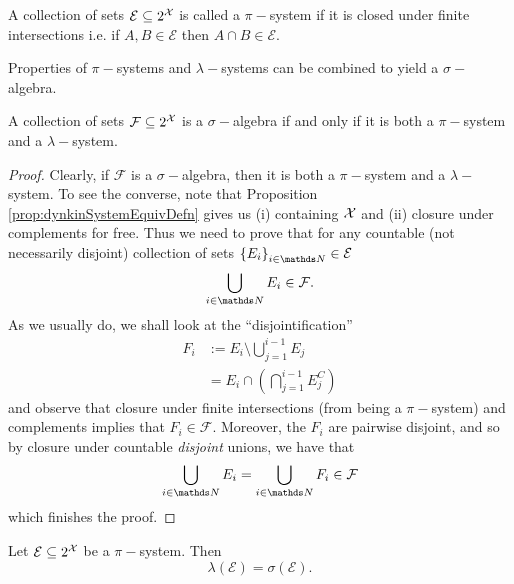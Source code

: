 \begin{defn}
\label{def:piSystem}A collection of sets $\mathcal{E}\subseteq2^{\mathcal{X}}$
is called a $\pi-$system if it is closed under finite intersections
i.e. if $A,B\in\mathcal{E}$ then $A\cap B\in\mathcal{E}$.
\end{defn}

Properties of $\pi-$systems and $\lambda-$systems can be combined
to yield a $\sigma-$algebra.
\begin{lem}
\label{lem:piLambdaIsSigma}A collection of sets $\mathcal{F}\subseteq2^{\mathcal{X}}$
is a $\sigma-$algebra if and only if it is both a $\pi-$system and
a $\lambda-$system.
\end{lem}

\begin{proof}
Clearly, if $\mathcal{F}$ is a $\sigma-$algebra, then it is both
a $\pi-$system and a $\lambda-$system. To see the converse, note
that Proposition \ref{prop:dynkinSystemEquivDefn} gives us (i) containing
$\mathcal{X}$ and (ii) closure under complements for free. Thus we need to
prove that for any countable (not necessarily disjoint) collection
of sets $\left\{ E_{i}\right\} _{i\in\N}\in\mathcal{E}$
\[
\bigcup_{i\in\N}E_{i}\in\mathcal{F}.
\]
As we usually do, we shall look at the ``disjointification''
\begin{align*}
F_{i} & :=E_{i}\setminus\bigcup_{j=1}^{i-1}E_{j}\\
 & =E_{i}\cap\left(\bigcap_{j=1}^{i-1}E_{j}^{C}\right)
\end{align*}
and observe that closure under finite intersections (from being a
$\pi-$system) and complements implies that $F_{i}\in\mathcal{F}$.
Moreover, the $F_{i}$ are pairwise disjoint, and so by closure under
countable \emph{disjoint }unions, we have that
\[
\bigcup_{i\in\N}E_{i}=\bigcup_{i\in\N}F_{i}\in\mathcal{F}
\]
which finishes the proof.
\end{proof}
\begin{thm}
\label{thm:piLambdaThm}Let $\mathcal{E}\subseteq2^{\mathcal{X}}$ be a $\pi-$system.
Then
\[
\lambda\left(\mathcal{E}\right)=\sigma\left(\mathcal{E}\right).
\]
\end{thm}

